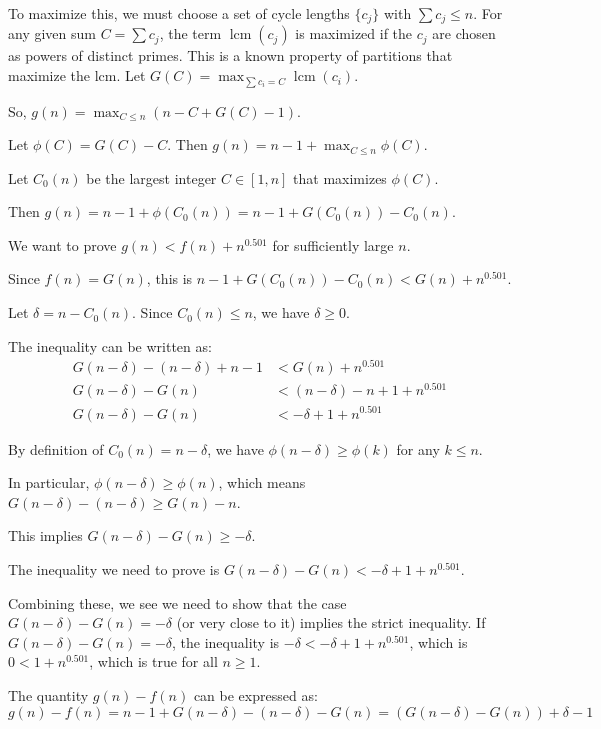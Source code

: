 \documentclass[12pt,a4paper]{article}
\theoremstyle{definition}
\begin{document}
        To maximize this, we must choose a set of cycle lengths $\{c_j\}$ with $\sum c_j \leq n$. For any given sum $C = \sum c_j$, the term $\operatorname{lcm}(c_j)$ is maximized if the $c_j$ are chosen as powers of distinct primes. This is a known property of partitions that maximize the lcm. Let $G(C) = \max_{\sum c_i=C} \operatorname{lcm}(c_i)$.

        So, $g(n) = \max_{C \leq n} (n-C+G(C)-1)$.

        Let $\phi(C) = G(C)-C$. Then $g(n) = n-1 + \max_{C \leq n} \phi(C)$.

        Let $C_0(n)$ be the largest integer $C \in [1,n]$ that maximizes $\phi(C)$.

        Then $g(n) = n-1+\phi(C_0(n)) = n-1+G(C_0(n))-C_0(n)$.

        We want to prove $g(n) < f(n) + n^{0.501}$ for sufficiently large $n$.

        Since $f(n)=G(n)$, this is $n-1+G(C_0(n))-C_0(n) < G(n) + n^{0.501}$.

        Let $\delta = n - C_0(n)$. Since $C_0(n) \leq n$, we have $\delta \geq 0$.

        The inequality can be written as:
        \begin{align}
            G(n-\delta) - (n-\delta) + n - 1 &< G(n) + n^{0.501}\\
            G(n-\delta) - G(n) &< (n-\delta) - n + 1 + n^{0.501}\\
            G(n-\delta) - G(n) &< -\delta + 1 + n^{0.501}
        \end{align}

        By definition of $C_0(n)=n-\delta$, we have $\phi(n-\delta) \geq \phi(k)$ for any $k \leq n$.

        In particular, $\phi(n-\delta) \geq \phi(n)$, which means $G(n-\delta)-(n-\delta) \geq G(n)-n$.

        This implies $G(n-\delta)-G(n) \geq -\delta$.

        The inequality we need to prove is $G(n-\delta)-G(n) < -\delta+1+n^{0.501}$.

        Combining these, we see we need to show that the case $G(n-\delta)-G(n) = -\delta$ (or very close to it) implies the strict inequality. If $G(n-\delta)-G(n) = -\delta$, the inequality is $-\delta < -\delta+1+n^{0.501}$, which is $0 < 1+n^{0.501}$, which is true for all $n \geq 1$.

        The quantity $g(n)-f(n)$ can be expressed as:
        $$g(n)-f(n) = n-1+G(n-\delta)-(n-\delta) - G(n) = (G(n-\delta)-G(n)) + \delta - 1$$
\end{document}
